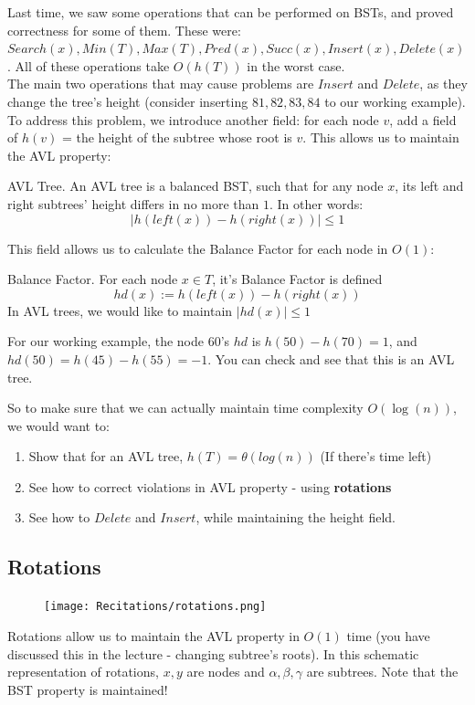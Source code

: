 Last time, we saw some operations that can be performed on BSTs, and
proved correctness for some of them. These were: $Search(x), Min(T), Max(T), Pred(x), Succ(x),
Insert(x), Delete(x)$. All of these operations take $O(h(T))$ in the worst case.\\

The main two operations that may cause problems are $Insert$ and $Delete$, as
they change the tree's height (consider inserting $81,82,83,84$ to our
working example).
To address this problem, we introduce another field: for each node $v$, add a field of $h(v)$ = the height of the subtree whose root is $v$. This allows us to maintain the AVL property:
\begin{defbox}{AVL Tree.} An AVL tree is a balanced BST, such that for any node $x$, its left and right subtrees' height differs in no more than $1$. In other words:
        $$|h(left(x)) - h(right(x))|\leq 1$$
    \end{defbox}
    This field allows us to calculate the Balance Factor for each node in $O
    (1)$:
    \begin{defbox}{Balance Factor.} For each node $x\in T$, it's Balance Factor is defined 
    $$hd
    (x) := h(left(x)) - h(right(x))$$ In AVL trees, we would like to maintain
    $|hd(x)| \leq 1$
    \end{defbox}
\begin{example} For our working example, the node $60$'s $hd$ is $h(50) - h
(70) = 1$, and $hd(50) = h(45)- h(55) = -1$. You can check and see that this is an AVL tree.
\end{example}
So to make sure that we can actually maintain time complexity $O(\log(n))$, we would want to:
\begin{enumerate}
    \item Show that for an AVL tree, $h(T) = \theta(log(n))$ (If there's time
    left)
    \item See how to correct violations in AVL property - using \textbf{rotations}
    \item See how to $Delete$ and $Insert$, while maintaining the height field.
\end{enumerate}

\subsection{Rotations}
\begin{figure}[h]
  \centering
\texttt{[image: Recitations/rotations.png]}\\
\end{figure}
Rotations allow us to maintain the AVL property in $O(1)$ time (you have
discussed this in the lecture - changing subtree's roots).
In
this
schematic
representation of rotations, $x,y$ are nodes and $\alpha,\beta,\gamma$ are subtrees.
Note that the BST property is maintained! \\

